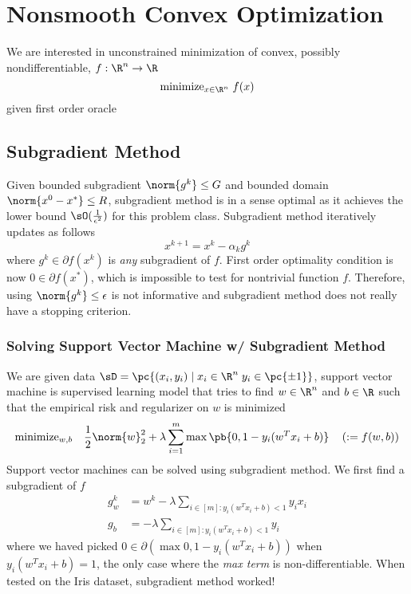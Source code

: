 \documentclass[11pt]{article}
\begin{document}
\section{Nonsmooth Convex Optimization}

We are interested in unconstrained minimization of convex, possibly nondifferentiable, $f:\R^n \to \R$ 
\[
    \text{minimize}_{x\in\R^n}\; f(x)
\]
given first order oracle

\subsection{Subgradient Method}

Given bounded subgradient $\norm{g^k}\leq G$ and bounded domain $\norm{x^0 - x^*} \leq R$, subgradient method is in a sense optimal as it achieves the lower bound $\sO(\frac{1}{\epsilon^2})$ for this problem class. Subgradient method iteratively updates as follows
\[
    x^{k+1}
        = x^k - \alpha_k g^k    
\]
where $g^k \in\partial f(x^k)$ is \textit{any} subgradient of $f$. First order optimality condition is now $0\in\partial f(x^*)$, which is impossible to test for nontrivial function $f$. Therefore, using $\norm{g^k}\leq \epsilon$ is not informative and subgradient method does not really have a stopping criterion.

\subsubsection{Solving Support Vector Machine w/ Subgradient Method}

We are given data $\sD = \pc{(x_i,y_i) \mid x_i\in\R^n \; y_i \in \pc{\pm 1}}$, support vector machine is supervised learning model that tries to find $w\in\R^n$ and $b\in\R$ such that the empirical risk and regularizer on $w$ is minimized
\begin{align*}
    \text{minimize}_{w,b} \quad
        \frac{1}{2} \norm{w}_2^2 + \lambda \sum_{i=1}^m \max\pb{0, 1 - y_i(w^Tx_i + b)} 
        \quad \left( := f(w,b) \right)
\end{align*}
Support vector machines can be solved using subgradient method. We first find a subgradient of $f$
\begin{align*}
    g_w^k
        &= w^k - \lambda \sum_{i\in[m]: y_i(w^Tx_i + b) < 1 } y_i x_i \\
    g_b
        &= -\lambda \sum_{i\in[m]: y_i(w^Tx_i + b) < 1 } y_i
\end{align*}
where we haved picked $0\in\partial (\max{0, 1- y_i(w^Tx_i + b)})$ when $y_i(w^Tx_i + b) = 1$, the only case where the \textit{max term} is non-differentiable. When tested on the Iris dataset, subgradient method worked!
\end{document}
